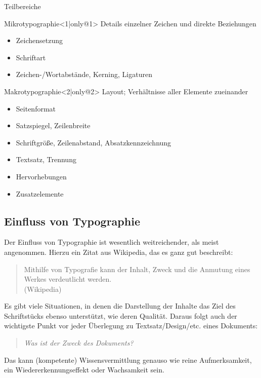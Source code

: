 \begin{frame}[t]{Teilbereiche}
  \begin{block}{Mikrotypographie}<1|only@1>
    Details einzelner Zeichen und direkte Beziehungen
    \begin{itemize}
    \item Zeichensetzung
    \item Schriftart
    \item Zeichen-/Wortabstände, Kerning, Ligaturen
    \end{itemize}
  \end{block}
  \begin{block}{Makrotypographie}<2|only@2>
    Layout; Verhältnisse aller Elemente zueinander
    \begin{itemize}
    \item Seitenformat
    \item Satzspiegel, Zeilenbreite
    \item Schriftgröße, Zeilenabstand, Absatzkennzeichnung
    \item Textsatz, Trennung
    \item Hervorhebungen
    \item Zusatzelemente
    \end{itemize}
  \end{block}
\end{frame}


\subsection{Einfluss von Typographie}
\frame{\subsectionpage}
Der Einfluss von Typographie ist wesentlich weitreichender, als meist
angenommen. Hierzu ein Zitat aus Wikipedia, das es ganz gut beschreibt:

\begin{frame}
  \begin{quote}
    Mithilfe von Typografie kann der Inhalt, Zweck und die Anmutung eines
    Werkes verdeutlicht werden. \\(Wikipedia)
  \end{quote}
\end{frame}

Es gibt viele Situationen, in denen die Darstellung der Inhalte das
Ziel des Schriftstücks ebenso unterstützt, wie deren Qualität.
Daraus folgt auch der wichtigste Punkt vor jeder Überlegung zu
Textsatz/Design/etc. eines Dokuments:
\begin{quote}
  \emph{Was ist der \emph{Zweck} des Dokuments?}
\end{quote}
Das kann (kompetente) Wissensvermittlung genauso wie reine
Aufmerksamkeit, ein Wiedererkennungseffekt oder Wachsamkeit sein.

